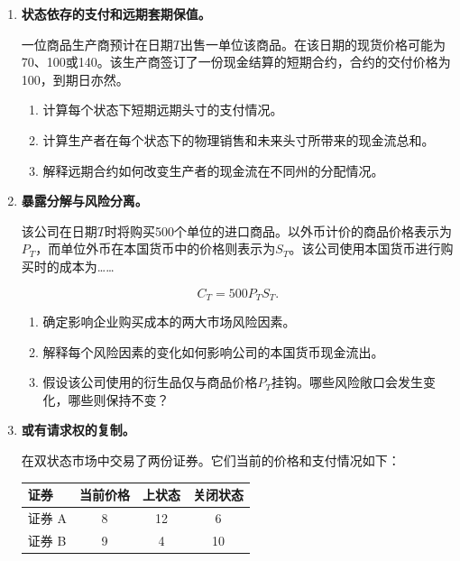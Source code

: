 

\begin{enumerate}

\item \textbf{状态依存的支付和远期套期保值。}

一位商品生产商预计在日期$T$出售一单位该商品。在该日期的现货价格可能为70、100或140。该生产商签订了一份现金结算的短期合约，合约的交付价格为100，到期日亦然。

\begin{enumerate}

\item 计算每个状态下短期远期头寸的支付情况。

\item 计算生产者在每个状态下的物理销售和未来头寸所带来的现金流总和。

\item 解释远期合约如何改变生产者的现金流在不同州的分配情况。

\end{enumerate}


\item \textbf{暴露分解与风险分离。}

该公司在日期$T$时将购买500个单位的进口商品。以外币计价的商品价格表示为$P_T$，而单位外币在本国货币中的价格则表示为$S_T$。该公司使用本国货币进行购买时的成本为……

\[
C_T=500P_TS_T.
\]

\begin{enumerate}

\item 确定影响企业购买成本的两大市场风险因素。

\item 解释每个风险因素的变化如何影响公司的本国货币现金流出。

\item 假设该公司使用的衍生品仅与商品价格$P_T$挂钩。哪些风险敞口会发生变化，哪些则保持不变？

\end{enumerate}


\item \textbf{或有请求权的复制。}

在双状态市场中交易了两份证券。它们当前的价格和支付情况如下：

\begin{center}
\begin{tabular}{lccc}
\toprule
\textbf{证券}
& \textbf{当前价格}
& \textbf{上状态}
& \textbf{关闭状态} \\
\midrule
证券 A & 8 & 12 & 6 \\
证券 B & 9 & 4 & 10 \\
\bottomrule
\end{tabular}
\end{center}


\end{enumerate}
